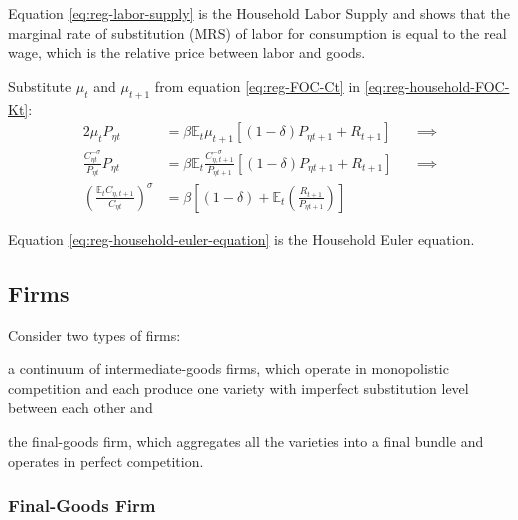 \documentclass[
thesis.tex
]{subfiles}
\begin{document}
Equation \ref{eq:reg-labor-supply} is the Household Labor Supply and shows that the marginal rate of substitution (MRS) of labor for consumption is equal to the real wage, which is the relative price between labor and goods.

Substitute $\mu_t$ and $\mu_{t+1}$ from equation \ref{eq:reg-FOC-Ct} in \ref{eq:reg-household-FOC-Kt}:
\begin{alignat}{2}
	\mu_t P_{\eta t} & = \beta \mathbb{E}_t \mu_{t+1} [(1-\delta) P_{\eta t+1} + R_{t+1}] \quad &\implies \nonumber \\
	\frac{C_{\eta t}^{-\sigma}}{P_{\eta t}} P_{\eta t} & = \beta \mathbb{E}_t \frac{C_{\eta, t+1}^{-\sigma}}{P_{\eta t+1}} [(1-\delta) P_{\eta t+1} + R_{t+1}] &\implies \nonumber \\
	\left( \frac{\mathbb{E}_t C_{\eta, t+1}}{C_{\eta t}} \right)^\sigma & = \beta \left[ (1-\delta) + \mathbb{E}_t \left(\frac{R_{t+1}}{P_{\eta t+1}}\right) \right] \label{eq:reg-household-euler-equation}
\end{alignat}

Equation \ref{eq:reg-household-euler-equation} is the Household Euler equation.


\subsection*{Firms}

Consider two types of firms: 
\begin{enumerate*}[label=(\arabic*)]
	\item a continuum of intermediate-goods firms, which operate in monopolistic competition and each produce one variety with imperfect substitution level between each other and
	
	\item the final-goods firm, which aggregates all the varieties into a final bundle and operates in perfect competition.
\end{enumerate*}


\subsubsection{Final-Goods Firm}
\end{document}
